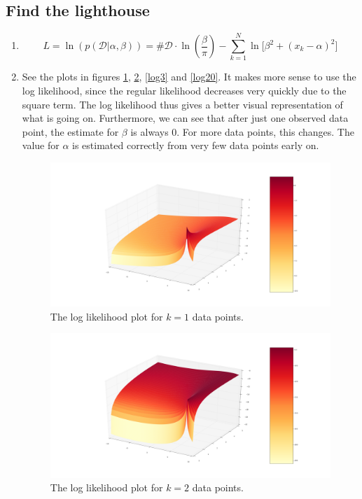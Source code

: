 \documentclass[paper=a4, fontsize=10pt]{scrartcl} %
\numberwithin{equation}{section} %
\numberwithin{figure}{section} %
\numberwithin{table}{section} %
\begin{document}
\subsection{Find the lighthouse}
\begin{enumerate}
	\item 

			\begin{equation}
				L = \ln(p(\mathcal{D} \vert \alpha, \beta)) = \#\mathcal{D} \cdot \ln(\frac{\beta}{\pi}) - \sum_{k=1}^N \ln \big[\beta^2 + (x_k - \alpha)^2\big]
			\end{equation}
	\item
			See the plots in figures \ref{log1}, \ref{log2}, \ref{log3} and \ref{log20}. It makes more sense to use the log likelihood, since the regular likelihood decreases very quickly due to the square term. The log likelihood thus gives a better visual representation of what is going on. Furthermore, we can see that after just one observed data point, the estimate for $\beta$ is always 0. For more data points, this changes. The value for $\alpha$ is estimated correctly from very few data points early on.


			\begin{figure}[H]
				\centering
				\includegraphics[width=\textwidth]{log1.png}
				\caption{The log likelihood plot for $k = 1$ data points.} 
				\label{log1}
			\end{figure}

			\begin{figure}[H]
				\centering
				\includegraphics[width=\textwidth]{log2.png}
				\caption{The log likelihood plot for $k = 2$ data points.} 
				\label{log2}
			\end{figure}


\end{enumerate}
\end{document}

